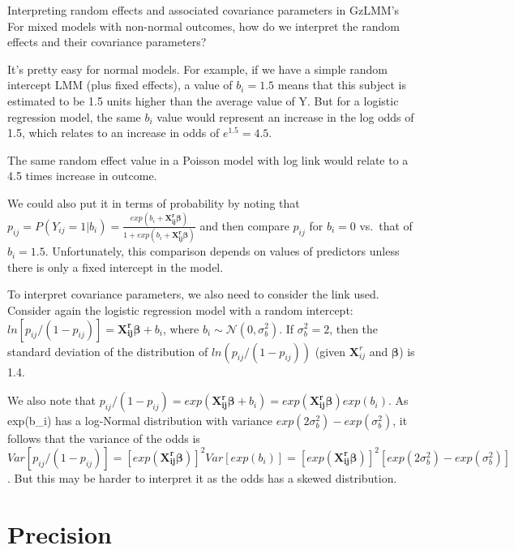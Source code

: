 \documentclass[
  9pt,
  ignorenonframetext,
]{beamer}
\begin{document}
\begin{frame}{Interpreting random effects and associated covariance
parameters in GzLMM's}
\protect\hypertarget{interpreting-random-effects-and-associated-covariance-parameters-in-gzlmms}{}
For mixed models with non-normal outcomes, how do we interpret the
random effects and their covariance parameters?

It's pretty easy for normal models. For example, if we have a simple
random intercept LMM (plus fixed effects), a value of \(b_i=1.5\) means
that this subject is estimated to be 1.5 units higher than the average
value of Y. But for a logistic regression model, the same \(b_i\) value
would represent an increase in the log odds of 1.5, which relates to an
increase in odds of \(e^{1.5}=4.5\).

The same random effect value in a Poisson model with log link would
relate to a 4.5 times increase in outcome.
\end{frame}

\begin{frame}{}
\protect\hypertarget{section-14}{}
We could also put it in terms of probability by noting that
\(p_{ij}=P(Y_{ij}=1|b_i)=\frac {exp(b_i+\pmb {X_{ij}^r \beta})} {1+exp( b_i+\pmb {X_{ij}^r \beta})}\)
and then compare \(p_{ij}\) for \(b_i=0\) vs.~that of \(b_i=1.5\).
Unfortunately, this comparison depends on values of predictors unless
there is only a fixed intercept in the model.

To interpret covariance parameters, we also need to consider the link
used. Consider again the logistic regression model with a random
intercept: \(ln⁡[ p_{ij}/(1-p_{ij})]=\pmb {X_{ij}^r \beta}+b_i\), where
\(b_i \sim \mathcal N (0,\sigma_b^2)\). If \(\sigma_b^2=2\), then the
standard deviation of the distribution of \(ln (p_{ij}/(1-p_{ij} ))\)
(given \(\pmb X_{ij}^r\) and \(\pmb \beta\)) is 1.4.

We also note that
\(p_{ij}/(1-p_{ij})=exp(\pmb {X_{ij}^r \beta}+b_i)=exp(\pmb {X_{ij}^r \beta})exp(b_i)\).
As exp(b\_i) has a log-Normal distribution with variance
\(exp(2\sigma_b^2 )-exp(\sigma_b^2)\), it follows that the variance of
the odds is
\(Var[p_{ij}/(1-p_{ij})]=[exp(\pmb {X_{ij}^r \beta})]^2 Var[exp(b_i)] =[exp(\pmb {X_{ij}^r \beta})]^2 [exp(2\sigma_b^2 )-exp(\sigma_b^2 )]\).
But this may be harder to interpret it as the odds has a skewed
distribution.
\end{frame}

\hypertarget{precision}{%
\section{Precision}\label{precision}}
\end{document}
